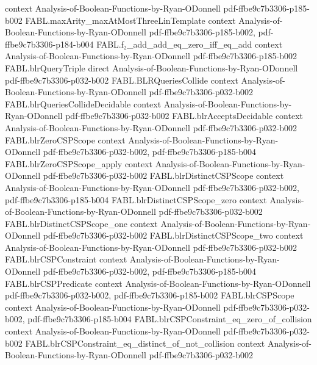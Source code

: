 \begin{theorem}
  {context}
  {Analysis-of-Boolean-Functions-by-Ryan-ODonnell}
  {pdf-ffbe9c7b3306-p185-b002}
\proofstep
  {FABL.maxArity_maxAtMostThreeLinTemplate}
  {context}
  {Analysis-of-Boolean-Functions-by-Ryan-ODonnell}
  {pdf-ffbe9c7b3306-p185-b002,
    pdf-ffbe9c7b3306-p184-b004}
\proofstep
  {FABL.f₂_add_add_eq_zero_iff_eq_add}
  {context}
  {Analysis-of-Boolean-Functions-by-Ryan-ODonnell}
  {pdf-ffbe9c7b3306-p185-b002}
\proofstep
  {FABL.blrQueryTriple}
  {direct}
  {Analysis-of-Boolean-Functions-by-Ryan-ODonnell}
  {pdf-ffbe9c7b3306-p032-b002}
\proofstep
  {FABL.BLRQueriesCollide}
  {context}
  {Analysis-of-Boolean-Functions-by-Ryan-ODonnell}
  {pdf-ffbe9c7b3306-p032-b002}
\proofstep
  {FABL.blrQueriesCollideDecidable}
  {context}
  {Analysis-of-Boolean-Functions-by-Ryan-ODonnell}
  {pdf-ffbe9c7b3306-p032-b002}
\proofstep
  {FABL.blrAcceptsDecidable}
  {context}
  {Analysis-of-Boolean-Functions-by-Ryan-ODonnell}
  {pdf-ffbe9c7b3306-p032-b002}
\proofstep
  {FABL.blrZeroCSPScope}
  {context}
  {Analysis-of-Boolean-Functions-by-Ryan-ODonnell}
  {pdf-ffbe9c7b3306-p032-b002,
    pdf-ffbe9c7b3306-p185-b004}
\proofstep
  {FABL.blrZeroCSPScope_apply}
  {context}
  {Analysis-of-Boolean-Functions-by-Ryan-ODonnell}
  {pdf-ffbe9c7b3306-p032-b002}
\proofstep
  {FABL.blrDistinctCSPScope}
  {context}
  {Analysis-of-Boolean-Functions-by-Ryan-ODonnell}
  {pdf-ffbe9c7b3306-p032-b002,
    pdf-ffbe9c7b3306-p185-b004}
\proofstep
  {FABL.blrDistinctCSPScope_zero}
  {context}
  {Analysis-of-Boolean-Functions-by-Ryan-ODonnell}
  {pdf-ffbe9c7b3306-p032-b002}
\proofstep
  {FABL.blrDistinctCSPScope_one}
  {context}
  {Analysis-of-Boolean-Functions-by-Ryan-ODonnell}
  {pdf-ffbe9c7b3306-p032-b002}
\proofstep
  {FABL.blrDistinctCSPScope_two}
  {context}
  {Analysis-of-Boolean-Functions-by-Ryan-ODonnell}
  {pdf-ffbe9c7b3306-p032-b002}
\proofstep
  {FABL.blrCSPConstraint}
  {context}
  {Analysis-of-Boolean-Functions-by-Ryan-ODonnell}
  {pdf-ffbe9c7b3306-p032-b002,
    pdf-ffbe9c7b3306-p185-b004}
\proofstep
  {FABL.blrCSPPredicate}
  {context}
  {Analysis-of-Boolean-Functions-by-Ryan-ODonnell}
  {pdf-ffbe9c7b3306-p032-b002,
    pdf-ffbe9c7b3306-p185-b002}
\proofstep
  {FABL.blrCSPScope}
  {context}
  {Analysis-of-Boolean-Functions-by-Ryan-ODonnell}
  {pdf-ffbe9c7b3306-p032-b002,
    pdf-ffbe9c7b3306-p185-b004}
\proofstep
  {FABL.blrCSPConstraint_eq_zero_of_collision}
  {context}
  {Analysis-of-Boolean-Functions-by-Ryan-ODonnell}
  {pdf-ffbe9c7b3306-p032-b002}
\proofstep
  {FABL.blrCSPConstraint_eq_distinct_of_not_collision}
  {context}
  {Analysis-of-Boolean-Functions-by-Ryan-ODonnell}
  {pdf-ffbe9c7b3306-p032-b002}

\end{theorem}
